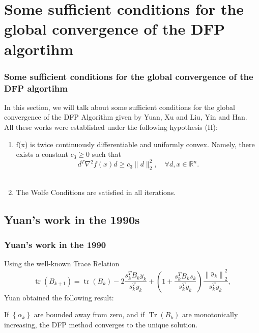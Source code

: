 \documentclass{beamer}
\begin{document}
\section{Some sufficient conditions for the global convergence of the DFP algortihm}

\begin{frame}
    \frametitle{Some sufficient conditions for the global convergence of the DFP algortihm}
    In this section, we will talk about some sufficient conditions for the global convergence of the DFP Algorithm given by Yuan\cite{Yuan}, Xu and Liu\cite{XL}, Yin and Han\cite{YH}.\\
    All these works were established under the following hypothesis (H):
    \begin{enumerate}
        \item f(x) is twice continuously differentiable and uniformly convex. Namely, there exists a constant $c_{3} \geq 0$ such that
    \begin{equation*}
        d^{T} \nabla^{2} f(x) d \geqslant c_{3}\|d\|_{2}^{2}, \quad \forall d, x \in \mathbb{R}^{n} . \tag{3.1}
    \end{equation*}\\
    \item The Wolfe Conditions are satisfied in all iterations.
    \end{enumerate}
\end{frame}


\subsection{Yuan's work in the 1990s}

\begin{frame}
    \frametitle{Yuan's work in the 1990}
        Using the well-known Trace Relation\begin{equation}
            \operatorname{tr}\left(B_{k+1}\right)=\operatorname{tr}\left(B_{k}\right)-2 \frac{s_{k}^{T} B_{k} y_{k}}{s_{k}^{T} y_{k}}+\left(1+\frac{s_{k}^{T} B_{k} s_{k}}{s_{k}^{T} y_{k}}\right) \frac{\left\|y_{k}\right\|_{2}^{2}}{s_{k}^{T} y_{k}},  \tag{3.2}
        \end{equation}
        Yuan obtained the following result:
        \begin{theorem}[Yuan,2.1]
            If $\left\{\alpha_{k}\right\}$ are bounded away from zero, and if $\operatorname{Tr}\left(B_{k}\right)$ are monotonically increasing, the DFP method converges to the unique solution.
        \end{theorem}
    

\end{frame}
\end{document}
